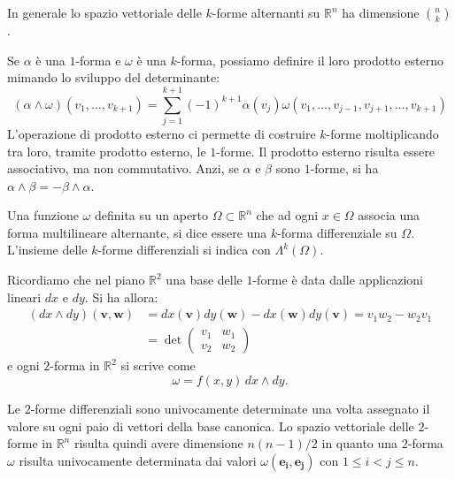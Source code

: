 \documentclass[italian,a4paper]{scrartcl}
\newcommand{\RR}{{\mathbb R}}
\renewcommand{\vec}{\mathbf}
\begin{document}
In generale lo spazio
vettoriale delle $k$-forme alternanti su $\RR^n$ ha dimensione ${n
  \choose k}$.

Se $\alpha$ è una $1$-forma e $\omega$ è una $k$-forma, possiamo
definire il loro prodotto esterno mimando lo sviluppo del
determinante:
\[
  (\alpha \wedge \omega)(v_1,\dots,v_{k+1}) = \sum_{j=1}^{k+1}
(-1)^{k+1}\alpha(v_j) \omega(v_1,\dots, v_{j-1},v_{j+1},\dots,v_{k+1})
\]
L'operazione di prodotto esterno ci permette di costruire
$k$-forme moltiplicando tra loro, tramite prodotto esterno, le
$1$-forme. Il prodotto esterno risulta essere associativo, ma non
commutativo. Anzi, se $\alpha$ e $\beta$ sono $1$-forme, si ha
$\alpha\wedge \beta  = - \beta \wedge \alpha$.

Una funzione $\omega$ definita su un aperto $\Omega\subset \RR^n$ che
ad ogni $x\in \Omega$ associa una forma multilineare alternante, si
dice essere una $k$-forma differenziale su $\Omega$. L'insieme delle
$k$-forme differenziali si indica con $\Lambda^k(\Omega)$.

\begin{example}
Ricordiamo che nel piano $\RR^2$ una base delle $1$-forme è
data dalle applicazioni lineari $dx$ e $dy$.
Si ha allora:
\begin{align*}
  (dx\wedge dy)(\vec v,\vec w) & =dx(\vec v)dy(\vec w) - dx(\vec w)dy(\vec v) = v_1 w_2 - w_2 v_1\\
&=\det \begin{pmatrix}
v_1 & w_1 \\
v_2 & w_2
\end{pmatrix}
\end{align*}
e ogni $2$-forma in $\RR^2$ si scrive come
\[
\omega = f(x,y)\, dx\wedge dy.
\]
\end{example}


Le $2$-forme differenziali sono univocamente determinate una volta
assegnato il valore su ogni paio di vettori della base
canonica. Lo spazio vettoriale delle $2$-forme in $\RR^n$ risulta
quindi avere dimensione $n(n-1)/2$ in quanto una $2$-forma $\omega$ risulta
univocamente determinata dai valori $\omega(\vec {e_i}, \vec {e_j})$
con $1 \le i < j \le n$.
\end{document}
